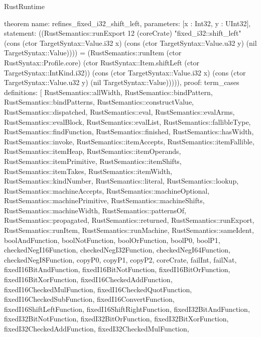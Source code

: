 \begin{lexlean}{RustRuntime}
\begin{semanticmodule}
theorem{
  name: refines_fixed_i32_shift_left,
  parameters: [x : Int32, y : UInt32],
  statement: ((RustSemantics::runExport 12 (coreCrate) "fixed_i32::shift_left" (cons (ctor TargetSyntax::Value.i32 x) (cons (ctor TargetSyntax::Value.u32 y) (nil TargetSyntax::Value)))) = (RustSemantics::runItem (ctor RustSyntax::Profile.core) (ctor RustSyntax::Item.shiftLeft (ctor TargetSyntax::IntKind.i32)) (cons (ctor TargetSyntax::Value.i32 x) (cons (ctor TargetSyntax::Value.u32 y) (nil TargetSyntax::Value))))),
  proof: term_cases{
    definitions: [
      RustSemantics::allWidth,
      RustSemantics::bindPattern,
      RustSemantics::bindPatterns,
      RustSemantics::constructValue,
      RustSemantics::dispatched,
      RustSemantics::eval,
      RustSemantics::evalArms,
      RustSemantics::evalBlock,
      RustSemantics::evalList,
      RustSemantics::fallibleType,
      RustSemantics::findFunction,
      RustSemantics::finished,
      RustSemantics::hasWidth,
      RustSemantics::invoke,
      RustSemantics::itemAccepts,
      RustSemantics::itemFallible,
      RustSemantics::itemHeap,
      RustSemantics::itemOperands,
      RustSemantics::itemPrimitive,
      RustSemantics::itemShifts,
      RustSemantics::itemTakes,
      RustSemantics::itemWidth,
      RustSemantics::kindNumber,
      RustSemantics::literal,
      RustSemantics::lookup,
      RustSemantics::machineAccepts,
      RustSemantics::machineOptional,
      RustSemantics::machinePrimitive,
      RustSemantics::machineShifts,
      RustSemantics::machineWidth,
      RustSemantics::patternsOf,
      RustSemantics::propagated,
      RustSemantics::returned,
      RustSemantics::runExport,
      RustSemantics::runItem,
      RustSemantics::runMachine,
      RustSemantics::sameIdent,
      boolAndFunction,
      boolNotFunction,
      boolOrFunction,
      boolP0,
      boolP1,
      checkedNegI16Function,
      checkedNegI32Function,
      checkedNegI64Function,
      checkedNegI8Function,
      copyP0,
      copyP1,
      copyP2,
      coreCrate,
      failInt,
      failNat,
      fixedI16BitAndFunction,
      fixedI16BitNotFunction,
      fixedI16BitOrFunction,
      fixedI16BitXorFunction,
      fixedI16CheckedAddFunction,
      fixedI16CheckedMulFunction,
      fixedI16CheckedQuotFunction,
      fixedI16CheckedSubFunction,
      fixedI16ConvertFunction,
      fixedI16ShiftLeftFunction,
      fixedI16ShiftRightFunction,
      fixedI32BitAndFunction,
      fixedI32BitNotFunction,
      fixedI32BitOrFunction,
      fixedI32BitXorFunction,
      fixedI32CheckedAddFunction,
      fixedI32CheckedMulFunction,
}}
\end{semanticmodule}
\end{lexlean}
